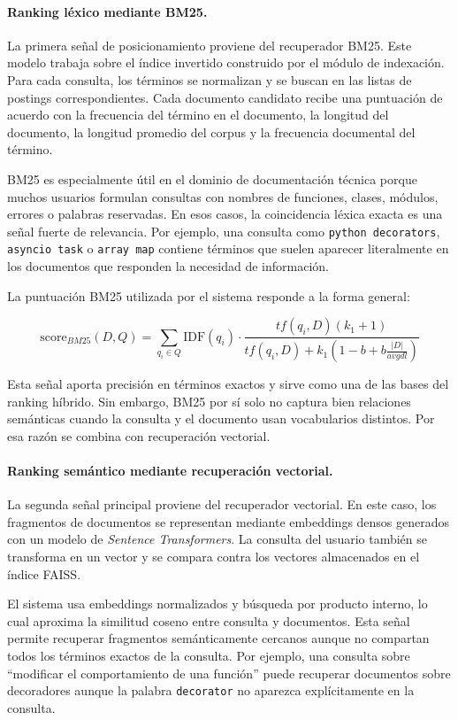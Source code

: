 \documentclass[11pt]{article}
\begin{document}
\paragraph{Ranking léxico mediante BM25.}
La primera señal de posicionamiento proviene del recuperador BM25. Este modelo trabaja sobre el
índice invertido construido por el módulo de indexación. Para cada consulta, los términos se
normalizan y se buscan en las listas de postings correspondientes. Cada documento candidato
recibe una puntuación de acuerdo con la frecuencia del término en el documento, la longitud del
documento, la longitud promedio del corpus y la frecuencia documental del término.

BM25 es especialmente útil en el dominio de documentación técnica porque muchos usuarios formulan
consultas con nombres de funciones, clases, módulos, errores o palabras reservadas. En esos casos,
la coincidencia léxica exacta es una señal fuerte de relevancia. Por ejemplo, una consulta como
\texttt{python decorators}, \texttt{asyncio task} o \texttt{array map} contiene términos que
suelen aparecer literalmente en los documentos que responden la necesidad de información.

La puntuación BM25 utilizada por el sistema responde a la forma general:

\[
\mathrm{score}_{BM25}(D,Q) =
\sum_{q_i \in Q}
\mathrm{IDF}(q_i)
\cdot
\frac{tf(q_i,D)(k_1+1)}
{tf(q_i,D) + k_1\left(1-b+b\frac{|D|}{avgdl}\right)}
\]

Esta señal aporta precisión en términos exactos y sirve como una de las bases del ranking
híbrido. Sin embargo, BM25 por sí solo no captura bien relaciones semánticas cuando la consulta y
el documento usan vocabularios distintos. Por esa razón se combina con recuperación vectorial.

\paragraph{Ranking semántico mediante recuperación vectorial.}
La segunda señal principal proviene del recuperador vectorial. En este caso, los fragmentos de
documentos se representan mediante embeddings densos generados con un modelo de
\emph{Sentence Transformers}. La consulta del usuario también se transforma en un vector y se
compara contra los vectores almacenados en el índice FAISS.

El sistema usa embeddings normalizados y búsqueda por producto interno, lo cual aproxima la
similitud coseno entre consulta y documentos. Esta señal permite recuperar fragmentos
semánticamente cercanos aunque no compartan todos los términos exactos de la consulta. Por
ejemplo, una consulta sobre ``modificar el comportamiento de una función'' puede recuperar
documentos sobre decoradores aunque la palabra \texttt{decorator} no aparezca explícitamente en
la consulta.
\end{document}

